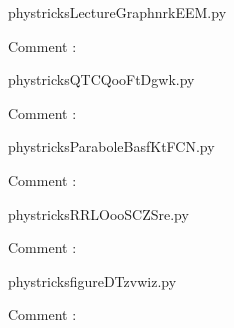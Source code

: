 
    \newcommand{\CaptionFigLectureGraphnrkEEM}{<+Type your caption here+>}
    \begin{center}
        
    \end{center}
    phystricksLectureGraphnrkEEM.py

    Comment : 

    \clearpage
    


    \newcommand{\CaptionFigQTCQooFtDgwk}{<+Type your caption here+>}
    \begin{center}
        
    \end{center}
    phystricksQTCQooFtDgwk.py

    Comment : 

    \clearpage
    


    \newcommand{\CaptionFigParaboleBasfKtFCN}{<+Type your caption here+>}
    \begin{center}
        
    \end{center}
    phystricksParaboleBasfKtFCN.py

    Comment : 

    \clearpage
    


    \newcommand{\CaptionFigRRLOooSCZSre}{<+Type your caption here+>}
    \begin{center}
        
    \end{center}
    phystricksRRLOooSCZSre.py

    Comment : 

    \clearpage
    


    \newcommand{\CaptionFigfigureDTzvwiz}{<+Type your caption here+>}
    \begin{center}
        
    \end{center}
    phystricksfigureDTzvwiz.py

    Comment : 

    \clearpage
    


